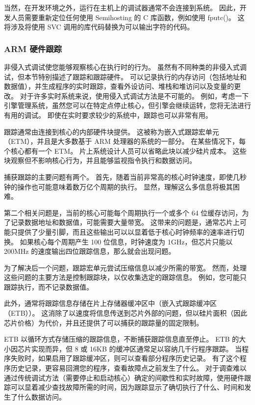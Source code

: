 当然，在开发环境之外，运行在主机上的调试器通常不会连接到系统。
因此，开发人员需要重新定位任何使用 Semihosting 的 C 库函数，例如使用 fputc()。
这将涉及将使用 SVC 调用的库代码替换为可以输出字符的代码。

\subsubsection{ARM 硬件跟踪}

非侵入式调试使您能够观察核心在执行时的行为。
虽然有不同种类的非侵入式调试，但本节特别描述了跟踪和跟踪硬件。
可以记录执行的内存访问（包括地址和数据值），并生成程序的实时跟踪，查看外设访问、堆栈和堆访问以及变量的更改。
对于许多实时系统来说，使用侵入式调试方法是不可能的。
例如，考虑一下引擎管理系统，虽然您可以在特定点停止核心，但引擎会继续运转，您将无法进行有用的调试。
即使在实时要求较少的系统中，跟踪也可以非常有用。

跟踪通常由连接到核心的内部硬件块提供。
这被称为嵌入式跟踪宏单元（ETM），并且是大多数基于 ARM 处理器的系统的一部分。
在某些情况下，每个核心都有一个 ETM。
片上系统设计人员可以省略此块以减少硅片成本。
这些块观察但不影响核心行为，并且能够监视指令执行和数据访问。

捕获跟踪的主要问题有两个。
首先，随着当前非常高的核心时钟速度，即使几秒钟的操作也可能意味着数万亿个周期的执行。
显然，理解这么多信息将极其困难。

第二个相关问题是，当前的核心可能每个周期执行一个或多个 64 位缓存访问，为了记录数据地址和数据值，可能需要大量带宽。
这带来的问题是，通常芯片上可能只提供了少量引脚，而且这些输出可以以显着低于核心时钟频率的速率进行切换。
如果核心每个周期产生 100 位信息，时钟速度为 1GHz，但芯片只能以 200MHz 的速度输出四位跟踪信息，那么就会出现问题。

为了解决后一个问题，跟踪宏单元尝试压缩信息以减少所需的带宽。
然而，处理这些问题的主要方法是控制跟踪块，以仅收集选定的跟踪信息。
例如，您可能只跟踪执行，而不记录数据值。

此外，通常将跟踪信息存储在片上存储器缓冲区中（嵌入式跟踪缓冲区（ETB））。
这消除了以速度将信息传送到芯片外部的问题，但以硅片面积（因此芯片价格）为代价，并且还提供了可以捕获的跟踪量的固定限制。

ETB 以循环方式存储压缩的跟踪信息，不断捕获跟踪信息直至停止。
ETB 的大小因芯片实现而异，但 8 或 16KB 的缓冲区通常足以容纳几千行程序跟踪。
当程序失败时，如果启用了跟踪缓冲区，则可以查看部分程序历史记录。
有了这个程序历史记录，更容易回溯您的程序，查看故障点之前发生了什么。
对于调查难以通过传统调试方法（需要停止和启动核心）确定的间歇性和实时故障，使用硬件跟踪可以显着减少查找故障所需的时间，因为跟踪显示了确切执行了什么、时间和发生了什么数据访问。

